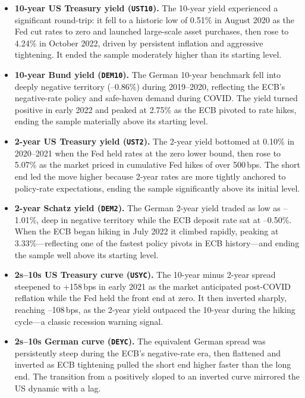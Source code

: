 \begin{itemize}
  \item \textbf{10-year US Treasury yield (\texttt{UST10}).}
    The 10-year yield experienced a significant round-trip: it fell to a
    historic low of 0.51\% in August 2020 as the Fed cut rates to zero and
    launched large-scale asset purchases, then rose to 4.24\% in
    October 2022, driven by persistent inflation and aggressive tightening.
    It ended the sample moderately higher than its starting level.

  \item \textbf{10-year Bund yield (\texttt{DEM10}).}
    The German 10-year benchmark fell into deeply negative territory
    (--0.86\%) during 2019--2020, reflecting the ECB's negative-rate policy
    and safe-haven demand during COVID. The yield turned positive in early 2022
    and peaked at 2.75\% as the ECB pivoted to rate hikes, ending the sample
    materially above its starting level.

  \item \textbf{2-year US Treasury yield (\texttt{UST2}).}
    The 2-year yield bottomed at 0.10\% in 2020--2021 when the Fed held rates
    at the zero lower bound, then rose to 5.07\% as the market priced in
    cumulative Fed hikes of over 500\,bps. The short end led the move higher
    because 2-year rates are more tightly anchored to policy-rate expectations,
    ending the sample significantly above its initial level.

  \item \textbf{2-year Schatz yield (\texttt{DEM2}).}
    The German 2-year yield traded as low as --1.01\%, deep in negative
    territory while the ECB deposit rate sat at --0.50\%. When the ECB began
    hiking in July 2022 it climbed rapidly, peaking at 3.33\%---reflecting
    one of the fastest policy pivots in ECB history---and ending the sample
    well above its starting level.

  \item \textbf{2s--10s US Treasury curve (\texttt{USYC}).}
    The 10-year minus 2-year spread steepened to +158\,bps in early 2021 as
    the market anticipated post-COVID reflation while the Fed held the front
    end at zero. It then inverted sharply, reaching --108\,bps, as the
    2-year yield outpaced the 10-year during the hiking cycle---a classic
    recession warning signal.

  \item \textbf{2s--10s German curve (\texttt{DEYC}).}
    The equivalent German spread was persistently steep during the ECB's
    negative-rate era, then flattened and inverted as ECB tightening pulled the
    short end higher faster than the long end. The transition from a positively
    sloped to an inverted curve mirrored the US dynamic with a lag.
\end{itemize}

